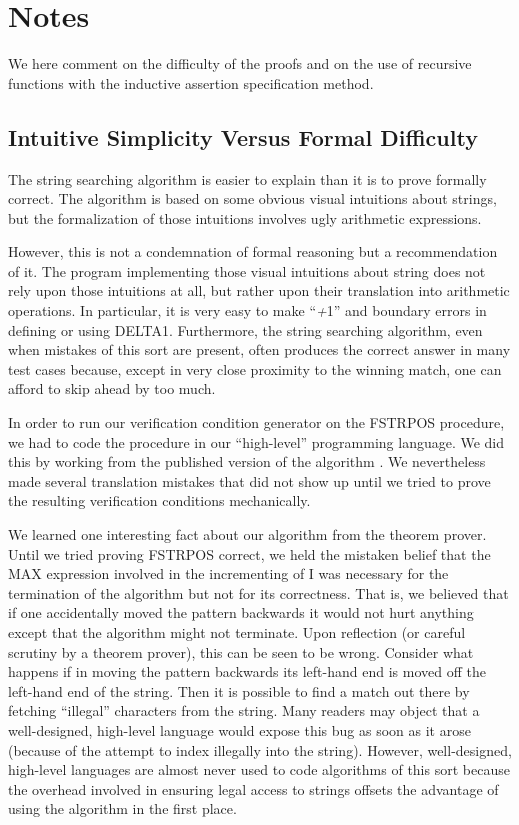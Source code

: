 \documentclass[10pt]{book}
\begin{document}
\section{Notes}
We here comment on the difficulty of the proofs and on the
use of recursive functions with the inductive assertion specification method.

\subsection{Intuitive Simplicity Versus Formal Difficulty}
The string searching algorithm is easier to explain than it is to prove formally correct.
The algorithm is based on some
obvious visual intuitions about strings, but the formalization
of those intuitions involves ugly arithmetic expressions.

However, this is not a condemnation of formal reasoning but
a recommendation of it.  The program
implementing those visual intuitions about string
does not rely upon those intuitions at all,
but rather upon their translation into arithmetic operations.
In particular, it is very easy to make ``\emph{+}1'' and boundary
errors in defining
or using DELTA1.
Furthermore, the string searching algorithm, even when  mistakes of
this sort are present, often produces the correct answer in many test cases because, except in very
close proximity to the winning match, one can afford to skip ahead by
too much.

In order to run our verification condition generator
on the FSTRPOS procedure, we had to code the procedure in our ``high-level''
programming language.  We did this by working from the published version of the
algorithm \cite{FSTRPOS}.  We nevertheless made several
translation mistakes that did not show up until we tried to prove
the resulting verification conditions mechanically.

We learned one interesting fact about our algorithm from the theorem
prover.  Until we tried proving FSTRPOS correct, we held the mistaken belief
that the MAX expression involved in the incrementing of I was
necessary for the termination of the algorithm but not for its correctness.
That is, we believed that if one accidentally moved the pattern backwards
it would not hurt anything except that the algorithm might not terminate.
Upon reflection (or careful scrutiny by a theorem prover), this can be seen to be wrong.
Consider what happens if in moving the pattern backwards
its left-hand end is moved off the left-hand end of the string.
Then it is possible to find a match out there by fetching ``illegal''
characters from the string.  Many readers may object
that a well-designed, high-level language would expose this bug as soon as it
arose (because of the attempt to  index illegally into the string).
However, well-designed, high-level languages are almost never
used to code algorithms of this sort because the overhead involved
in ensuring legal access to strings 
offsets the advantage of using the algorithm in the first place.
\end{document}
